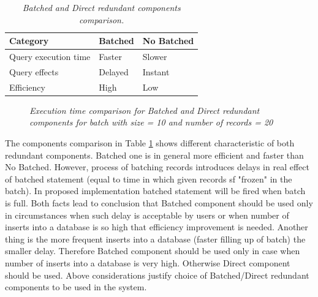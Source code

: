 \documentclass[10pt,a4paper]{article}
\begin{document}
\begin{table}[!htb]
\def\arraystretch{1.5}
\caption{\textit{Batched and Direct redundant components comparison.}}\label{batchedcomponents}
\begin{tabularx}{\textwidth}{p{4cm}|X|X}
  \textbf{Category} &\textbf{Batched} & \textbf{No Batched} \\
\hline
Query execution time & Faster & Slower \\
Query effects & Delayed & Instant\\
Efficiency & High & Low\\
\end{tabularx}
\end{table}

\begin{figure}[!htb]
\centering
{}
\caption{\textit{Execution time comparison for Batched and Direct redundant components for batch with size = 10 and number of records = 20}} \label{fig:batchedtime}
\end{figure}

The components comparison in Table \ref{batchedcomponents} shows different characteristic of both redundant components. Batched one is in general more efficient and faster than No Batched. However, process of batching records introduces delays in real effect of batched statement (equal to time in which given records sf "frozen" in the batch). In proposed implementation batched statement will be fired when batch is full. Both facts lead to conclusion that Batched component should be used only in circumstances when such delay is acceptable by users or when number of inserts into a database is so high that efficiency improvement is needed. Another thing is the more frequent inserts into a database (faster filling up of batch) the smaller delay. Therefore Batched component should be used only in case when number of inserts into a database is very high. Otherwise Direct component should be used. Above considerations justify choice of Batched/Direct redundant components to be used in the system.   
\end{document}
